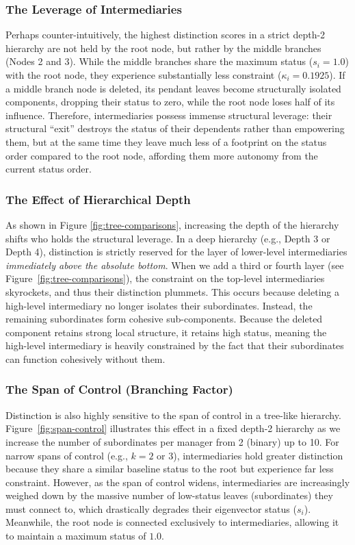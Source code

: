 \documentclass[12pt]{article}
\begin{document}
\subsubsection{The Leverage of Intermediaries}
Perhaps counter-intuitively, the highest distinction scores in a strict depth-2 hierarchy are not held by the root node, but rather by the middle branches (Nodes 2 and 3). While the middle branches share the maximum status ($s_i = 1.0$) with the root node, they experience substantially less constraint ($\kappa_i = 0.1925$). If a middle branch node is deleted, its pendant leaves become structurally isolated components, dropping their status to zero, while the root node loses half of its influence. Therefore, intermediaries possess immense structural leverage: their structural ``exit'' destroys the status of their dependents rather than empowering them, but at the same time they leave much less of a footprint on the status order compared to the root node, affording them more autonomy from the current status order. 

\subsubsection{The Effect of Hierarchical Depth}
As shown in Figure \ref{fig:tree-comparisons}, increasing the depth of the hierarchy shifts who holds the structural leverage. In a deep hierarchy (e.g., Depth 3 or Depth 4), distinction is strictly reserved for the layer of lower-level intermediaries \textit{immediately above the absolute bottom}. When we add a third or fourth layer (see Figure~\ref{fig:tree-comparisons}), the constraint on the top-level intermediaries skyrockets, and thus their distinction plummets. This occurs because deleting a high-level intermediary no longer isolates their subordinates. Instead, the remaining subordinates form cohesive sub-components. Because the deleted component retains strong local structure, it retains high status, meaning the high-level intermediary is heavily constrained by the fact that their subordinates can function cohesively without them.

\subsubsection{The Span of Control (Branching Factor)}
Distinction is also highly sensitive to the span of control in a tree-like hierarchy. Figure~\ref{fig:span-control} illustrates this effect in a fixed depth-2 hierarchy as we increase the number of subordinates per manager from 2 (binary) up to 10. For narrow spans of control (e.g., $k=2$ or $3$), intermediaries hold greater distinction because they share a similar baseline status to the root but experience far less constraint. However, as the span of control widens, intermediaries are increasingly weighed down by the massive number of low-status leaves (subordinates) they must connect to, which drastically degrades their eigenvector status ($s_i$). Meanwhile, the root node is connected exclusively to intermediaries, allowing it to maintain a maximum status of $1.0$.
\end{document}
